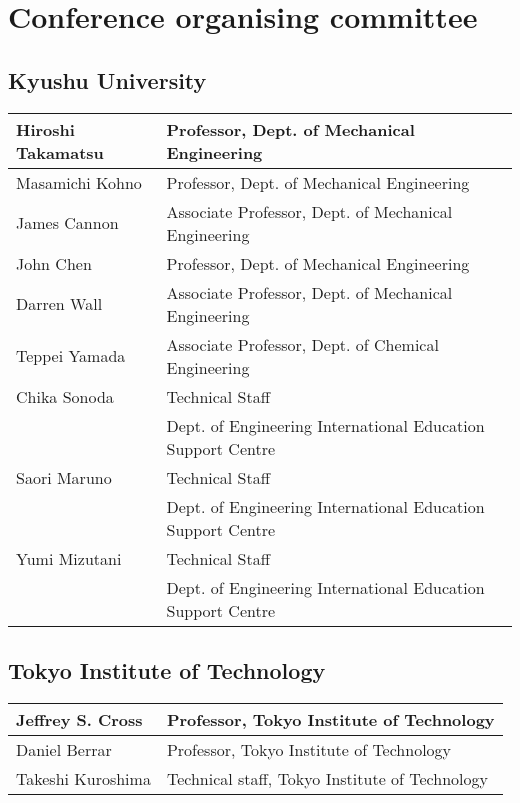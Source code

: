 \section{Conference organising committee}

\subsection*{Kyushu University}

\begin{center}
    \begin{tabular}{|l|l|}
        \hline
        Hiroshi Takamatsu & Professor, Dept. of Mechanical Engineering \\
        \hline
        Masamichi Kohno & Professor, Dept. of Mechanical Engineering \\
        \hline
        James Cannon    & Associate Professor, Dept. of Mechanical Engineering \\
        \hline
        John Chen       & Professor, Dept. of Mechanical Engineering \\
        \hline
        Darren Wall     & Associate Professor, Dept. of Mechanical Engineering \\
        \hline
        Teppei Yamada   & Associate Professor, Dept. of Chemical Engineering \\
        \hline
        Chika Sonoda    & Technical Staff \\ 
                        & Dept. of Engineering International Education Support Centre \\
        \hline
        Saori Maruno    & Technical Staff\\
                        & Dept. of Engineering International Education Support Centre \\
        \hline
        Yumi Mizutani   & Technical Staff\\
                        & Dept. of Engineering International Education Support Centre \\
        \hline
    \end{tabular}
\end{center}

\subsection*{Tokyo Institute of Technology}

\begin{center}
    \begin{tabular}{|l|l|}
        \hline
        Jeffrey S. Cross & Professor, Tokyo Institute of Technology \\
        \hline
        Daniel Berrar & Professor, Tokyo Institute of Technology \\
        \hline
        Takeshi Kuroshima & Technical staff, Tokyo Institute of Technology \\
        \hline
    \end{tabular}
\end{center}
